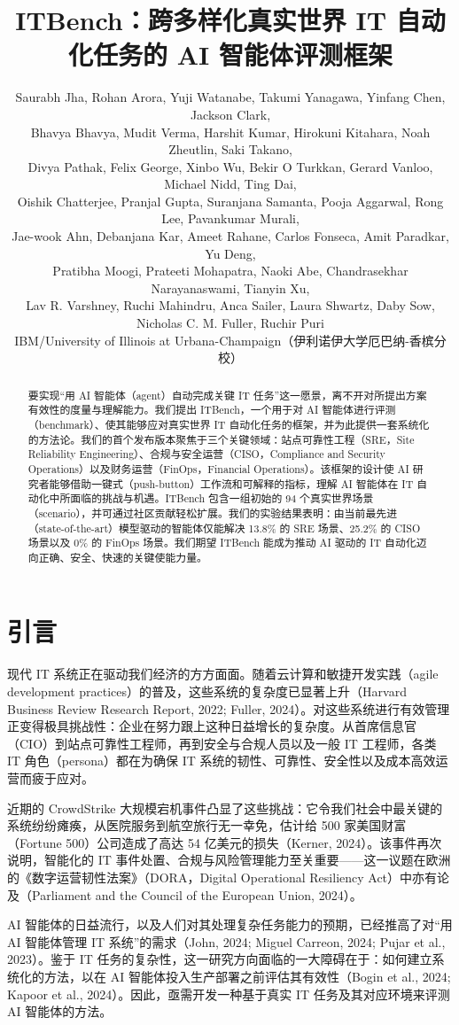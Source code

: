 \documentclass[10pt,UTF8,fontset=fandol]{ctexart}
\title{\textbf{ITBench：跨多样化真实世界 IT 自动化任务的 AI 智能体评测框架}}
\author{Saurabh Jha, Rohan Arora, Yuji Watanabe, Takumi Yanagawa, Yinfang Chen, Jackson Clark,\\
Bhavya Bhavya, Mudit Verma, Harshit Kumar, Hirokuni Kitahara, Noah Zheutlin, Saki Takano,\\
Divya Pathak, Felix George, Xinbo Wu, Bekir O Turkkan, Gerard Vanloo, Michael Nidd, Ting Dai,\\
Oishik Chatterjee, Pranjal Gupta, Suranjana Samanta, Pooja Aggarwal, Rong Lee, Pavankumar Murali,\\
Jae-wook Ahn, Debanjana Kar, Ameet Rahane, Carlos Fonseca, Amit Paradkar, Yu Deng,\\
Pratibha Moogi, Prateeti Mohapatra, Naoki Abe, Chandrasekhar Narayanaswami, Tianyin Xu,\\
Lav R. Varshney, Ruchi Mahindru, Anca Sailer, Laura Shwartz, Daby Sow, Nicholas C. M. Fuller, Ruchir Puri\\[0.3em]
\normalsize IBM\quad/\quad University of Illinois at Urbana-Champaign（伊利诺伊大学厄巴纳-香槟分校）}
\date{}
\begin{document}
\maketitle
\begin{abstract}
要实现“用 AI 智能体（agent）自动完成关键 IT 任务”这一愿景，离不开对所提出方案有效性的度量与理解能力。我们提出 ITBench，一个用于对 AI 智能体进行评测（benchmark）、使其能够应对真实世界 IT 自动化任务的框架，并为此提供一套系统化的方法论。我们的首个发布版本聚焦于三个关键领域：站点可靠性工程（SRE，Site Reliability Engineering）、合规与安全运营（CISO，Compliance and Security Operations）以及财务运营（FinOps，Financial Operations）。该框架的设计使 AI 研究者能够借助一键式（push-button）工作流和可解释的指标，理解 AI 智能体在 IT 自动化中所面临的挑战与机遇。ITBench 包含一组初始的 94 个真实世界场景（scenario），并可通过社区贡献轻松扩展。我们的实验结果表明：由当前最先进（state-of-the-art）模型驱动的智能体仅能解决 13.8\% 的 SRE 场景、25.2\% 的 CISO 场景以及 0\% 的 FinOps 场景。我们期望 ITBench 能成为推动 AI 驱动的 IT 自动化迈向正确、安全、快速的关键使能力量。
\end{abstract}

\section{引言}

现代 IT 系统正在驱动我们经济的方方面面。随着云计算和敏捷开发实践（agile development practices）的普及，这些系统的复杂度已显著上升（Harvard Business Review Research Report, 2022; Fuller, 2024）。对这些系统进行有效管理正变得极具挑战性：企业在努力跟上这种日益增长的复杂度。从首席信息官（CIO）到站点可靠性工程师，再到安全与合规人员以及一般 IT 工程师，各类 IT 角色（persona）都在为确保 IT 系统的韧性、可靠性、安全性以及成本高效运营而疲于应对。

近期的 CrowdStrike 大规模宕机事件凸显了这些挑战：它令我们社会中最关键的系统纷纷瘫痪，从医院服务到航空旅行无一幸免，估计给 500 家美国财富（Fortune 500）公司造成了高达 54 亿美元的损失（Kerner, 2024）。该事件再次说明，智能化的 IT 事件处置、合规与风险管理能力至关重要——这一议题在欧洲的《数字运营韧性法案》（DORA，Digital Operational Resiliency Act）中亦有论及（Parliament and the Council of the European Union, 2024）。

AI 智能体的日益流行，以及人们对其处理复杂任务能力的预期，已经推高了对“用 AI 智能体管理 IT 系统”的需求（John, 2024; Miguel Carreon, 2024; Pujar et al., 2023）。鉴于 IT 任务的复杂性，这一研究方向面临的一大障碍在于：如何建立系统化的方法，以在 AI 智能体投入生产部署之前评估其有效性（Bogin et al., 2024; Kapoor et al., 2024）。因此，亟需开发一种基于真实 IT 任务及其对应环境来评测 AI 智能体的方法。
\end{document}
